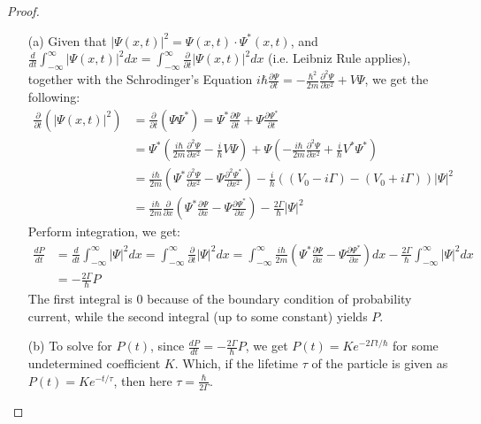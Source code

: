 \documentclass{article}
\begin{document}
\begin{proof}

    \hfil

    \begin{itemize}
        \item[(a)] Given that $|\Psi(x,t)|^2=\Psi(x,t)\cdot \Psi^*(x,t)$, and $\frac{d}{dt}\int_{-\infty}^{\infty}|\Psi(x,t)|^2dx = \int_{-\infty}^{\infty}\frac{\partial}{\partial t}|\Psi(x,t)|^2 dx$ (i.e. Leibniz Rule applies), together with the Schrodinger's Equation $i\hbar \frac{\partial \Psi}{\partial t}=-\frac{\hbar^2}{2m}\frac{\partial^2\Psi}{\partial x^2}+V\Psi$, we get the following:
        \begin{align}
            \frac{\partial}{\partial t}\left(|\Psi(x,t)|^2\right) &= \frac{\partial }{\partial t}\left(\Psi \Psi^*\right) = \Psi^*\frac{\partial\Psi}{\partial t}+\Psi\frac{\partial \Psi^*}{\partial t}\\
            &= \Psi^*\left(\frac{i\hbar}{2m}\frac{\partial^2\Psi}{\partial x^2}-\frac{i}{\hbar}V\Psi\right)+ \Psi\left(-\frac{i\hbar}{2m}\frac{\partial^2\Psi}{\partial x^2}+\frac{i}{\hbar}V^*\Psi^*\right)\\
            &=\frac{i\hbar}{2m}\left(\Psi^*\frac{\partial^2\Psi}{\partial x^2}-\Psi\frac{\partial^2\Psi^*}{\partial x^2}\right)-\frac{i}{\hbar}\left((V_0-i\Gamma)-(V_0+i\Gamma)\right)|\Psi|^2\\
            &= \frac{i\hbar}{2m}\frac{\partial}{\partial x}\left(\Psi^*\frac{\partial\Psi}{\partial x}-\Psi\frac{\partial\Psi^*}{\partial x}\right)- \frac{2\Gamma}{\hbar}|\Psi|^2
        \end{align}
        Perform integration, we get:
        \begin{align}
            \frac{dP}{dt}&=\frac{d}{dt}\int_{-\infty}^{\infty}|\Psi|^2dx = \int_{-\infty}^{\infty}\frac{\partial}{\partial t}|\Psi|^2 dx = \int_{-\infty}^{\infty}\frac{i\hbar}{2m}\left(\Psi^*\frac{\partial\Psi}{\partial x}-\Psi\frac{\partial\Psi^*}{\partial x}\right)dx- \frac{2\Gamma}{\hbar}\int_{-\infty}^{\infty}|\Psi|^2dx\\
            &= -\frac{2\Gamma}{\hbar}P
        \end{align}
        The first integral is $0$ because of the boundary condition of probability current, while the second integral (up to some constant) yields $P$.
        \item[(b)] To solve for $P(t)$, since $\frac{dP}{dt}=-\frac{2\Gamma}{\hbar}P$, we get $P(t)=Ke^{-2\Gamma t/\hbar}$ for some undetermined coefficient $K$. Which, if the lifetime $\tau$ of the particle is given as $P(t)=Ke^{-t/\tau}$, then here $\tau=\frac{\hbar}{2\Gamma}$.
    \end{itemize}
\end{proof}
\end{document}
